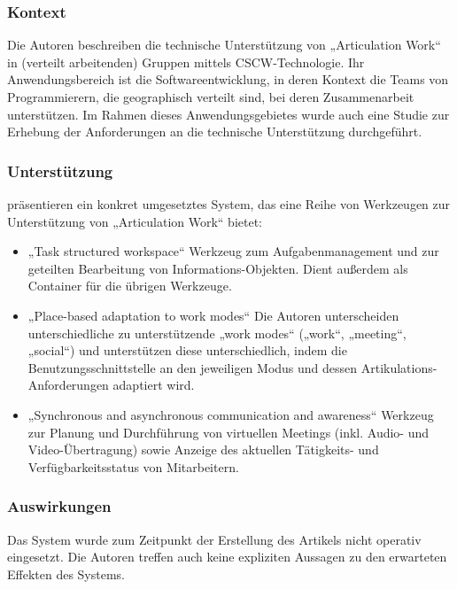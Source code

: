 \subsubsection{Kontext}

Die Autoren beschreiben die technische Unterstützung von „Articulation Work“ in (verteilt arbeitenden) Gruppen mittels \gls{CSCW}-Technologie. Ihr Anwendungsbereich ist die Softwareentwicklung, in deren Kontext die Teams von Programmierern, die geographisch verteilt sind, bei deren Zusammenarbeit unterstützen. Im Rahmen dieses Anwendungsgebietes wurde auch eine Studie zur Erhebung der Anforderungen an die technische Unterstützung durchgeführt.

\subsubsection{Unterstützung}

\citet{Fuchs01} präsentieren ein konkret umgesetztes System, das eine Reihe von Werkzeugen zur Unterstützung von „Articulation Work“ bietet:
\begin{itemize}
	\item „Task structured workspace“ Werkzeug zum Aufgabenmanagement und zur geteilten Bearbeitung von Informations-Objekten. Dient außerdem als Container für die übrigen Werkzeuge.
	\item „Place-based adaptation to work modes“ Die Autoren unterscheiden unterschiedliche zu unterstützende „work modes“ („work“, „meeting“, „social“) und unterstützen diese unterschiedlich, indem die Benutzungsschnittstelle an den jeweiligen Modus und dessen Artikulations-Anforderungen adaptiert wird.
	\item „Synchronous and asynchronous communication and awareness“ Werkzeug zur Planung und Durchführung von virtuellen Meetings (inkl. Audio- und Video-Übertragung) sowie Anzeige des aktuellen Tätigkeits- und Verfügbarkeitsstatus von Mitarbeitern.
\end{itemize}

\subsubsection{Auswirkungen}

Das System wurde zum Zeitpunkt der Erstellung des Artikels nicht operativ eingesetzt. Die Autoren treffen auch keine expliziten Aussagen zu den erwarteten Effekten des Systems.

